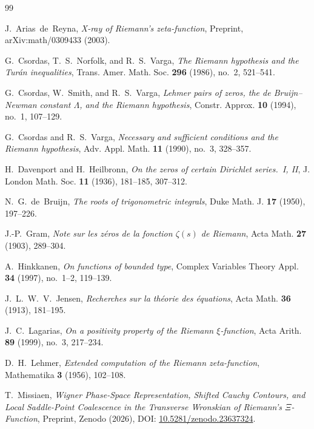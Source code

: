 \documentclass[11pt,a4paper,reqno]{amsart}
\theoremstyle{definition}
\theoremstyle{remark}
\numberwithin{equation}{section}
\begin{document}
\begin{thebibliography}{99}

J.~Arias~de~Reyna, \emph{X-ray of Riemann's zeta-function}, Preprint, arXiv:math/0309433 (2003).

G.~Csordas, T.~S.~Norfolk, and R.~S.~Varga, \emph{The Riemann hypothesis and the Tur\'an inequalities}, Trans. Amer. Math. Soc. \textbf{296} (1986), no.~2, 521--541.

G.~Csordas, W.~Smith, and R.~S.~Varga, \emph{Lehmer pairs of zeros, the de Bruijn--Newman constant $\Lambda$, and the Riemann hypothesis}, Constr. Approx. \textbf{10} (1994), no.~1, 107--129.

G.~Csordas and R.~S.~Varga, \emph{Necessary and sufficient conditions and the Riemann hypothesis}, Adv. Appl. Math. \textbf{11} (1990), no.~3, 328--357.

H.~Davenport and H.~Heilbronn, \emph{On the zeros of certain Dirichlet series.~I, II}, J. London Math. Soc. \textbf{11} (1936), 181--185, 307--312.

N.~G.~de~Bruijn, \emph{The roots of trigonometric integrals}, Duke Math. J. \textbf{17} (1950), 197--226.

J.-P.~Gram, \emph{Note sur les z\'eros de la fonction $\zeta(s)$ de Riemann}, Acta Math. \textbf{27} (1903), 289--304.

A.~Hinkkanen, \emph{On functions of bounded type}, Complex Variables Theory Appl. \textbf{34} (1997), no.~1--2, 119--139.

J.~L.~W.~V.~Jensen, \emph{Recherches sur la th\'eorie des \'equations}, Acta Math. \textbf{36} (1913), 181--195.

J.~C.~Lagarias, \emph{On a positivity property of the Riemann $\xi$-function}, Acta Arith. \textbf{89} (1999), no.~3, 217--234.

D.~H.~Lehmer, \emph{Extended computation of the Riemann zeta-function}, Mathematika \textbf{3} (1956), 102--108.

T.~Missiaen, \emph{Wigner Phase-Space Representation, Shifted Cauchy Contours, and Local Saddle-Point Coalescence in the Transverse Wronskian of Riemann's $\Xi$-Function}, Preprint, Zenodo (2026), DOI: \href{https://doi.org/10.5281/zenodo.23637324}{10.5281/zenodo.23637324}.


\end{thebibliography}
\end{document}

